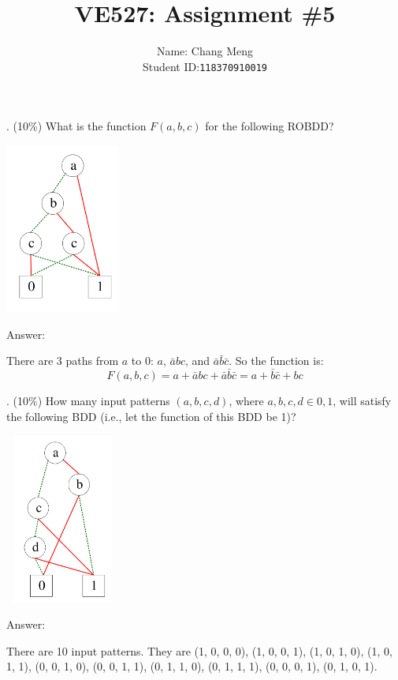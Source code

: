 \documentclass[12pt]{article}
\title{VE527: Assignment \#5} %
\author{Name: Chang Meng\\Student ID:\@\texttt{118370910019}}
\date{}
\begin{document}
    \maketitle
    . (10\%) What is the function $F(a, b, c)$ for the following ROBDD\@?
    \begin{center}
        \includegraphics[width = 1.50in, height = 2.20in]{figure1.png}
    \end{center}

    \noindent
    Answer:

    \noindent
    There are 3 paths from $a$ to $0$:
    $a$,
    $\bar{a}bc$,
    and $\bar{a}\bar{b}\bar{c}$.
    So the function is:
    \[
        F(a, b, c) = a + \bar{a}bc + \bar{a}\bar{b}\bar{c} = a + \bar{b}\bar{c} + bc
    \]

    . (10\%) How many input patterns $(a, b, c, d)$,
    where $a, b, c, d \in {0, 1}$,
    will satisfy the following BDD (i.e., let the function of this BDD be 1)?

    \begin{center}
        \includegraphics[width = 1.50in, height = 2.20in]{figure2.png}
    \end{center}

    \noindent
    Answer:

    \noindent
    There are 10 input patterns.
    They are (1, 0, 0, 0), (1, 0, 0, 1), (1, 0, 1, 0), (1, 0, 1, 1),
    (0, 0, 1, 0), (0, 0, 1, 1), (0, 1, 1, 0), (0, 1, 1, 1),
    (0, 0, 0, 1), (0, 1, 0, 1).
\end{document}
